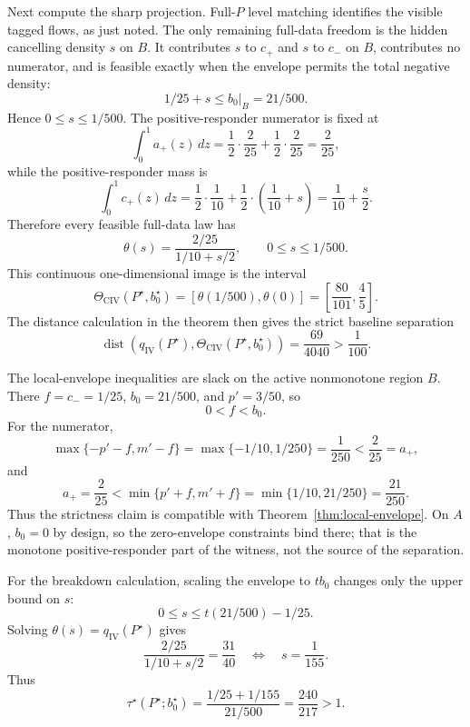 \documentclass[11pt]{article}
\theoremstyle{definition}
\theoremstyle{plain}
\theoremstyle{remark}
\begin{document}
Next compute the sharp projection.  Full-\(P\) level matching identifies the
visible tagged flows, as just noted.  The only remaining full-data freedom is
the hidden cancelling density \(s\) on \(B\).  It contributes \(s\) to \(c_+\)
and \(s\) to \(c_-\) on \(B\), contributes no numerator, and is feasible
exactly when the envelope permits the total negative density:
\[
1/25+s\le b_0|_B=21/500.
\]
Hence \(0\le s\le1/500\).  The positive-responder numerator is fixed at
\[
\int_0^1a_+(z)\,dz
=
\frac12\cdot\frac2{25}+\frac12\cdot\frac2{25}
=\frac2{25},
\]
while the positive-responder mass is
\[
\int_0^1c_+(z)\,dz
=
\frac12\cdot\frac1{10}
+\frac12\cdot\left(\frac1{10}+s\right)
=
\frac1{10}+\frac{s}{2}.
\]
Therefore every feasible full-data law has
\[
\theta(s)=
\frac{2/25}{1/10+s/2},
\qquad 0\le s\le1/500.
\]
This continuous one-dimensional image is the interval
\[
\Theta_{\mathrm{CIV}}(P^\star,b_0^\star)
=
\left[
\theta(1/500),\theta(0)
\right]
=
\left[
\frac{80}{101},\frac45
\right].
\]
The distance calculation in the theorem then gives the strict baseline
separation
\[
\operatorname{dist}\!\left(q_{\mathrm{IV}}(P^\star),
\Theta_{\mathrm{CIV}}(P^\star,b_0^\star)\right)
=\frac{69}{4040}>\frac1{100}.
\]

The local-envelope inequalities are slack on the active nonmonotone region
\(B\).  There \(f=c_-=1/25\), \(b_0=21/500\), and \(p'=3/50\), so
\[
0<f<b_0.
\]
For the numerator,
\[
\max\{-p'-f,m'-f\}
=
\max\{-1/10,1/250\}
=\frac1{250}
<
\frac2{25}=a_+,
\]
and
\[
a_+=\frac2{25}
<
\min\{p'+f,m'+f\}
=
\min\{1/10,21/250\}
=\frac{21}{250}.
\]
Thus the strictness claim is compatible with Theorem~\ref{thm:local-envelope}.
On \(A\), \(b_0=0\) by design, so the zero-envelope constraints bind there;
that is the monotone positive-responder part of the witness, not the source of
the separation.

For the breakdown calculation, scaling the envelope to \(t b_0\) changes only
the upper bound on \(s\):
\[
0\le s\le t(21/500)-1/25.
\]
Solving \(\theta(s)=q_{\mathrm{IV}}(P^\star)\) gives
\[
\frac{2/25}{1/10+s/2}=\frac{31}{40}
\quad\Longleftrightarrow\quad
s=\frac1{155}.
\]
Thus
\[
\tau^\star(P^\star;b_0^\star)
=
\frac{1/25+1/155}{21/500}
=
\frac{240}{217}>1.
\]
\end{document}

